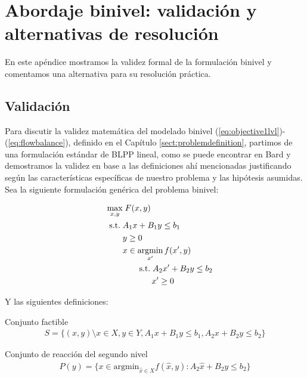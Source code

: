 \chapter{Abordaje binivel: validación y alternativas de resolución}
\label{sect:apendixbilevel}

En este apéndice mostramos la validez formal de la formulación binivel y comentamos una alternativa para su resolución práctica.

\section{Validación}
\label{sect:apendixbilevelvalidation}

Para discutir la validez matemática del modelado binivel (\ref{eq:objective1lvl})-(\ref{eq:flowbalance}), definido en el Capítulo \ref{sect:problemdefinition}, partimos de una formulación estándar de BLPP lineal, como se puede encontrar en Bard \textcite{bardbook} y demostramos la validez en base a las definiciones ahí mencionadas justificando según las características específicas de nuestro problema y las hipótesis asumidas. Sea la siguiente formulación genérica del problema binivel:

\begin{align}
\max_{x, y}               & \; F(x, y) \label{bilevelgeneric1} \\
\hspace{1.5em} \text{s.t.}\; & A_1 x + B_1 y \leq b_1 \\
                          & y \geq 0 \\
                          & x \in \mathop{\mathrm{argmin}}_{x'} f(x', y) \\
                          & \qquad \text{s.t.}\; A_2 x' + B_2 y \leq b_2 \label{bilevelgeneric5} \\
                          & \qquad \hspace{1.5em} x' \geq 0 \label{bilevelgeneric6}
\end{align}

\clearpage
Y las siguientes definiciones:

\begin{definition}
Conjunto factible
\begin{align}
  S = \{(x, y) \setminus x \in X, y \in Y, A_1 x + B_1 y \leq b_1, A_2 x + B_2 y \leq b_2 \}
\end{align}
\end{definition}

\begin{definition}
Conjunto de reacción del segundo nivel
\begin{align}
  P(y) = \{ x \in \text{argmin}_{\hat{x} \in X} f(\hat{x}, y) : A_2 \hat{x} + B_2 y \leq b_2 \}
\end{align}
\end{definition}

